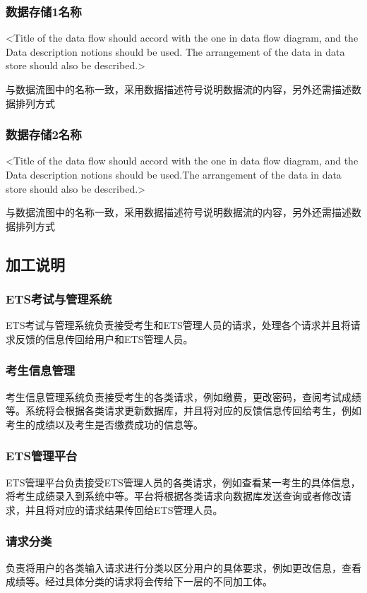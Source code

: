 \subsubsection{数据存储1名称}
<Title of  the data flow should accord with the one in data flow diagram, and the Data description notions should be used. The arrangement of the data in data store should also be described.>

与数据流图中的名称一致，采用数据描述符号说明数据流的内容，另外还需描述数据排列方式

\subsubsection{数据存储2名称}
<Title of  the data flow should accord with the one in data flow diagram, and the Data description notions should be used.The arrangement of the data in data store should also be described.>

与数据流图中的名称一致，采用数据描述符号说明数据流的内容，另外还需描述数据排列方式

\subsection{加工说明}
\subsubsection{ETS考试与管理系统}
ETS考试与管理系统负责接受考生和ETS管理人员的请求，处理各个请求并且将请求反馈的信息传回给用户和ETS管理人员。

\subsubsection{考生信息管理}
考生信息管理系统负责接受考生的各类请求，例如缴费，更改密码，查阅考试成绩等。系统将会根据各类请求更新数据库，并且将对应的反馈信息传回给考生，例如考生的成绩以及考生是否缴费成功的信息等。

\subsubsection{ETS管理平台}
ETS管理平台负责接受ETS管理人员的各类请求，例如查看某一考生的具体信息，将考生成绩录入到系统中等。平台将根据各类请求向数据库发送查询或者修改请求，并且将对应的请求结果传回给ETS管理人员。

\subsubsection{请求分类}
负责将用户的各类输入请求进行分类以区分用户的具体要求，例如更改信息，查看成绩等。经过具体分类的请求将会传给下一层的不同加工体。

